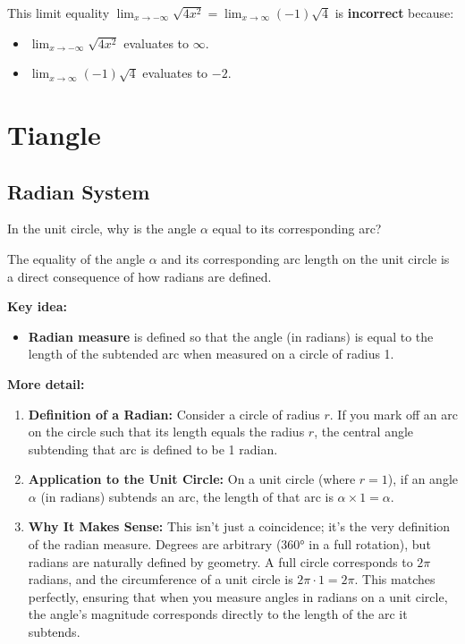 \documentclass[a4paper,12pt]{book}
\begin{document}
This limit equality \( \lim_{x \to -\infty} \sqrt{4x^2} = \lim_{x \to \infty} (-1)\sqrt{4} \) is \textbf{incorrect} because:
\begin{itemize}
\item 
\( \lim_{x \to -\infty} \sqrt{4x^2} \) evaluates to \( \infty \).

\item 
\( \lim_{x \to \infty} (-1)\sqrt{4} \) evaluates to \( -2 \).

\end{itemize}

\chapter{Tiangle}

\section{Radian System}

\begin{bluebox}
In the unit circle, why is the angle \(\alpha\) equal to its corresponding arc?
\end{bluebox}

The equality of the angle \(\alpha\) and its corresponding arc length on the unit circle is a direct consequence of how radians are defined.

\textbf{Key idea:}
\begin{itemize}
\item 
\textbf{Radian measure} is defined so that the angle (in radians) is equal to the length of the subtended arc when measured on a circle of radius 1.

\end{itemize}

\textbf{More detail:}
\begin{enumerate}
\item 
\textbf{Definition of a Radian:}\newline
Consider a circle of radius \(r\). If you mark off an arc on the circle such that its length equals the radius \(r\), the central angle subtending that arc is defined to be 1 radian.

\item 
\textbf{Application to the Unit Circle:}\newline
On a unit circle (where \(r = 1\)), if an angle \(\alpha\) (in radians) subtends an arc, the length of that arc is \(\alpha \times 1 = \alpha\).

\item 
\textbf{Why It Makes Sense:}\newline
This isn’t just a coincidence; it’s the very definition of the radian measure. Degrees are arbitrary (360° in a full rotation), but radians are naturally defined by geometry. A full circle corresponds to \(2\pi\) radians, and the circumference of a unit circle is \(2\pi \cdot 1 = 2\pi\). This matches perfectly, ensuring that when you measure angles in radians on a unit circle, the angle’s magnitude corresponds directly to the length of the arc it subtends.

\end{enumerate}
\end{document}
